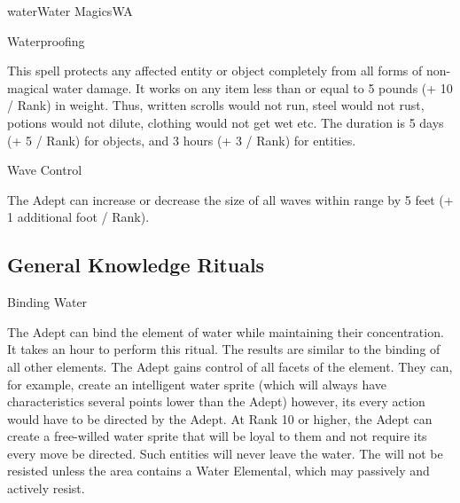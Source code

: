 \begin{college}[1.3]{water}{Water Magics}{WA}
\begin{spell}[G-13]{Waterproofing}

\begin{effects}
This spell protects any affected entity or object completely from all
forms of non-magical water damage. It works on any item less than or
equal to 5 pounds (+ 10 / Rank) in weight. Thus, written scrolls would
not run, steel would not rust, potions would not dilute, clothing
would not get wet etc.  The duration is 5 days (+ 5 / Rank) for
objects, and 3 hours (+ 3 / Rank) for entities.
\end{effects}
\end{spell}

\begin{spell}[G-14]{Wave Control}

\begin{effects}
The Adept can increase or decrease the size of all waves within range
by 5 feet (+ 1 additional foot / Rank).
\end{effects}
\end{spell}

\subsection{General Knowledge Rituals}

\begin{ritual}[Q-1]{Binding Water}

\begin{effects}
The Adept can bind the element of water while maintaining their
concentration. It takes an hour to perform this ritual. The results
are similar to the binding of all other elements. The Adept gains
control of all facets of the element. They can, for example, create an
intelligent water sprite (which will always have characteristics
several points lower than the Adept) however, its every action would
have to be directed by the Adept. At Rank 10 or higher, the Adept can
create a free-willed water sprite that will be loyal to them and not
require its every move be directed. Such entities will never leave the
water.  The will not be resisted unless the area contains a Water
Elemental, which may passively and actively resist.
\end{effects}
\end{ritual}


\end{college}
